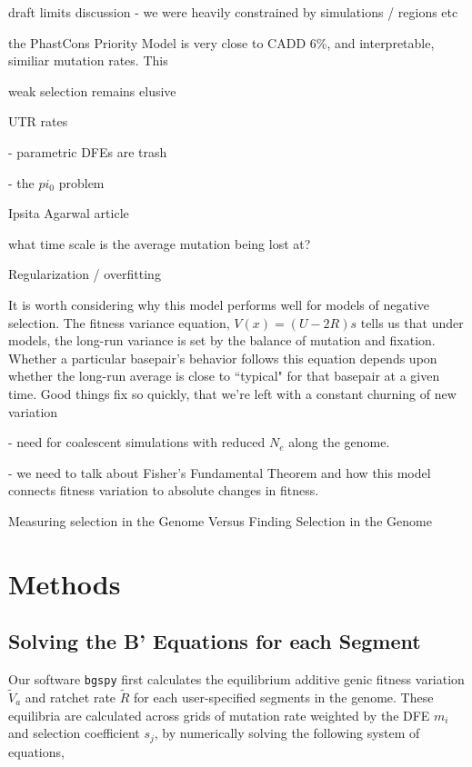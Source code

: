 \documentclass[11pt]{article}
\begin{document}
draft limits discussion - we were heavily constrained by simulations / regions
etc

the PhastCons Priority Model is very close to CADD 6\%, and interpretable,
similiar mutation rates. This 

weak selection remains elusive

UTR rates 

- parametric DFEs are trash

- the $pi_0$ problem

Ipsita Agarwal article 

what time scale is the average mutation being lost at?

Regularization / overfitting 

It is worth considering why this model performs well for models of negative
selection. The fitness variance equation, $V(x) = (U-2R)s$ tells us that under
models, the long-run variance is set by the balance of mutation and fixation.
Whether a particular basepair's behavior follows this equation depends upon
whether the long-run average is close to ``typical" for that basepair at a
given time. Good things fix so quickly, that we're left with a constant
churning of new variation

- need for coalescent simulations with reduced $N_e$ along the genome.

- we need to talk about Fisher's Fundamental Theorem and how this model
connects fitness variation to absolute changes in fitness.

Measuring selection in the Genome Versus Finding Selection in the Genome


\section*{Methods}

\subsection*{Solving the B' Equations for each Segment}
\label{sec:methods-bprime-eqns}

Our software \texttt{bgspy} first calculates the equilibrium additive genic
fitness variation $\widetilde{V}_a$ and ratchet rate $\widetilde{R}$ for each
user-specified segments in the genome. These equilibria are calculated across
grids of mutation rate weighted by the DFE $m_i$ and selection coefficient
$s_j$, by numerically solving the following system of equations,
\end{document}
